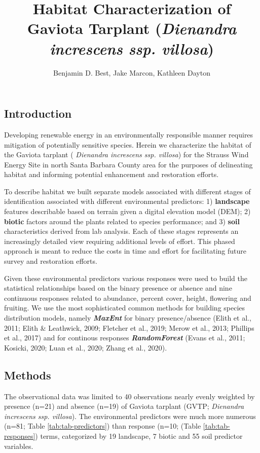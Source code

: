 \documentclass[
]{article}
\title{Habitat Characterization of Gaviota Tarplant (\emph{Dienandra increscens ssp. villosa})}
\author{Benjamin D. Best, Jake Marcon, Kathleen Dayton}
\date{}
\begin{document}
\maketitle

{
\setcounter{tocdepth}{2}
\tableofcontents
}
\hypertarget{introduction}{%
\subsection{Introduction}\label{introduction}}

Developing renewable energy in an environmentally responsible manner requires mitigation of potentially sensitive species. Herein we characterize the habitat of the Gaviota tarplant ( \emph{Dienandra increscens ssp. villosa}) for the Strauss Wind Energy Site in north Santa Barbara County area for the purposes of delineating habitat and informing potential enhancement and restoration efforts.

To describe habitat we built separate models associated with different stages of identification associated with different environmental predictors: 1) \textbf{landscape} features describable based on terrain given a digital elevation model (DEM); 2) \textbf{biotic} factors around the plants related to species performance; and 3) \textbf{soil} characteristics derived from lab analysis. Each of these stages represents an increasingly detailed view requiring additional levels of effort. This phased approach is meant to reduce the costs in time and effort for facilitating future survey and restoration efforts.

Given these environmental predictors various responses were used to build the statistical relationships based on the binary presence or absence and nine continuous responses related to abundance, percent cover, height, flowering and fruiting. We use the most sophisticated common methods for building species distribution models, namely \emph{\textbf{MaxEnt}} for binary presence/absence (Elith et al., 2011; Elith \& Leathwick, 2009; Fletcher et al., 2019; Merow et al., 2013; Phillips et al., 2017) and for continous responses \emph{\textbf{RandomForest}} (Evans et al., 2011; Kosicki, 2020; Luan et al., 2020; Zhang et al., 2020).

\hypertarget{methods}{%
\subsection{Methods}\label{methods}}

The observational data was limited to 40 observations nearly evenly weighted by presence (n=21) and absence (n=19) of Gaviota tarplant (GVTP; \emph{Dienandra increscens ssp. villosa}). The environmental predictors were much more numerous (n=81; Table \ref{tab:tab-predictors}) than response (n=10; (Table \ref{tab:tab-responses}) terms, categorized by 19 landscape, 7 biotic and 55 soil predictor variables.
\end{document}
